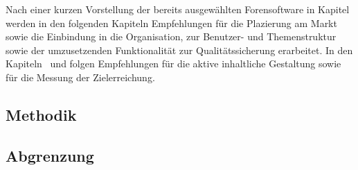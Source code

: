 Nach einer kurzen Vorstellung der bereits ausgewählten Forensoftware in Kapitel~ werden in den folgenden Kapiteln Empfehlungen für die Plazierung am Markt  sowie die Einbindung in die Organisation, zur Benutzer- und Themenstruktur sowie der umzusetzenden Funktionalität zur Qualitätssicherung erarbeitet. In den Kapiteln~ und  folgen Empfehlungen für die aktive inhaltliche Gestaltung sowie für die Messung der Zielerreichung.

\subsection{Methodik} %
\label{sub:methodik}


\subsection{Abgrenzung} %
\label{sub:abgrenzung}



